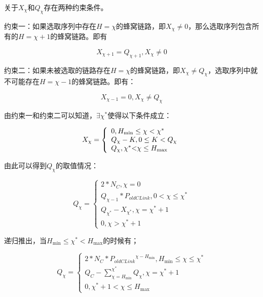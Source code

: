 \documentclass[figurelist,tablelist,algorithmlist,nomlist,masters]{seuthesix}
\begin{document}
	关于$X_{\chi }$和$Q_{\chi }$存在两种约束条件。
		
		约束一：如果选取序列中存在$H = \chi $的蜂窝链路，即$X_\chi \ne 0$，那么选取序列包含所有的$H = \chi + 1$的蜂窝链路。即有
		
		\begin{equation}\label{eq3.1}
		X_{\chi  + 1} = Q_{\chi  + 1},X_\chi \ne 0 
	\end{equation}
	
	
	约束二：如果未被选取的链路存在$H = \chi $的蜂窝链路，即$X_{\chi } \ne Q_{\chi }$，选取序列中就不可能存在$H = \chi - 1$的蜂窝链路。即有：
	
	\begin{equation}\label{eq3.1}
	X_{\chi  - 1} = 0,X_{\chi } \ne Q_{\chi }
	\end{equation}
	
	由约束一和约束二可以知道，$\exists \chi ^*$使得以下条件成立：
	
	
	\begin{equation}\label{eq3.1}
	{X_\chi } = \left\{ \begin{array}{l}
	0,{H_{\min }} \le \chi  < {\chi ^*}\\
	{Q_\chi } - K,0 \le K < {Q_\chi }\\
	{Q_\chi },{\chi ^*}{\rm{ <  }}\chi  \le {H_{\max }}
	\end{array} \right.
	\end{equation}
	
	由此可以得到$Q_{\chi}$的取值情况：
	
	\begin{equation}\label{eq3.1}
	Q_{\chi } = \left\{ \begin{array}{l}
	2*N_C,\chi = 0\\
	Q_{\chi - 1}*{P_{oldCLink}},0 < \chi  \le \chi ^*\\
	Q_{\chi ^*} - X_{\chi ^*},\chi  = \chi ^* + 1\\
	0,\chi  > \chi ^* + 1
	\end{array} \right.
	\end{equation}
	
	递归推出，当$H_{\min } \le \chi ^* < H_{\max }$的时候有；
	
	\begin{equation}\label{eq3.1}
	Q_\chi  = \left\{ \begin{array}{l}
	2*N_C*{P_{oldCLink}}^{\chi - H_{\min }},H_{\min } \le \chi  \le \chi ^*\\
	Q_C - \sum\limits_{\chi = H_{\min }}^{\chi ^*} {Q_{\chi }} ,\chi  = {\chi ^* + 1}\\
	0,\chi ^* + 1 < \chi  \le {H_{\max }}
	\end{array} \right.
	\end{equation}
\end{document}
